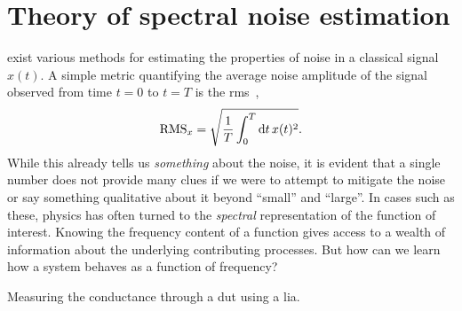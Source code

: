 \chapter{Theory of spectral noise estimation}\label{ch:speck:theory}
 exist various methods for estimating the properties of noise in a classical signal $x(t)$.
A simple metric quantifying the average noise amplitude of the signal observed from time $t=0$ to $t=T$ is the \gls{rms}~\cite{RMSOxford},
\begin{align}\label{eq:speck:rms:timedomain}
    \operatorname{RMS}_x = \sqrt{\frac{1}{T}\int_{0}^{T}\dd{t}x(t)^2}.
\end{align}
While this already tells us \emph{something} about the noise, it is evident that a single number does not provide many clues if we were to attempt to mitigate the noise or say something qualitative about it beyond \enquote{small} and \enquote{large}.
In cases such as these, physics has often turned to the \emph{spectral} representation of the function of interest.
Knowing the frequency content of a function gives access to a wealth of information about the underlying contributing processes.
But how can we learn how a system behaves as a function of frequency?

\begin{marginfigure}[-2.5cm]
    \centering
    
    \caption{Measuring the conductance through a \gls{dut} using a \gls{lia}.}
    \label{fig:speck:theory:lockin_dut}
\end{marginfigure}

